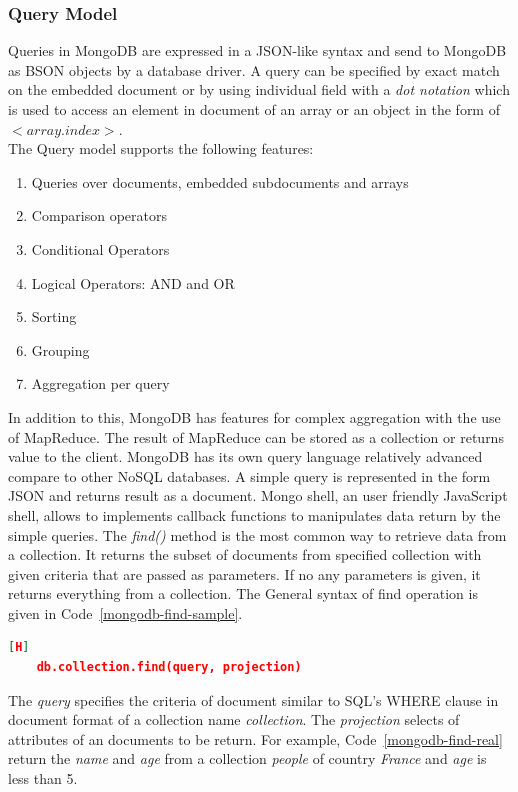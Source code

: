 \subsubsection{Query Model}
Queries in MongoDB are expressed in a JSON-like syntax and send to MongoDB as BSON objects by a database driver\citep{orend2010analysis}. A query can be specified by exact match on the embedded document or by using individual field with a \textit{dot notation} which is used to access an element in document of an array or an object in the form of  $<$$array$.$index$$>$.\\
The Query model supports the following features:
\begin{enumerate}
	\item Queries over documents, embedded subdocuments and arrays
	\item Comparison operators
	\item Conditional Operators
	\item Logical Operators: AND and OR
	\item Sorting 
	\item Grouping
	\item Aggregation per query
\end{enumerate}
In addition to this, MongoDB has features for complex aggregation with the use of MapReduce. The result of MapReduce can be stored as a collection or returns value to the client\citep{orend2010analysis}.
MongoDB has its own query language relatively advanced compare to other NoSQL databases. A simple  query  is represented in the form JSON and returns result as a document.  Mongo shell, an user friendly JavaScript shell,  allows to implements callback functions to manipulates data return by the simple queries.  The \textit{find()} method is the most common way to retrieve data from a collection. It returns  the subset of documents from specified collection with given criteria that are passed as parameters. If no any parameters is given, it returns everything from a collection.  The General syntax of find operation is given in Code~\ref{mongodb-find-sample}.
\begin{lstlisting}[language=JSON,caption=\textit{find} in MongoDB, label=mongodb-find-sample][H]
    db.collection.find(query, projection) 
\end{lstlisting}
 The \textit{query} specifies the criteria of document similar to SQL's WHERE clause in document format of a collection name \textit{collection}. The \textit{projection} selects of attributes of an documents to be return. For example, Code~\ref{mongodb-find-real} return the \textit{name} and \textit{age} from a collection  \textit{people} of country \textit{France} and \textit{age} is less than 5. 

